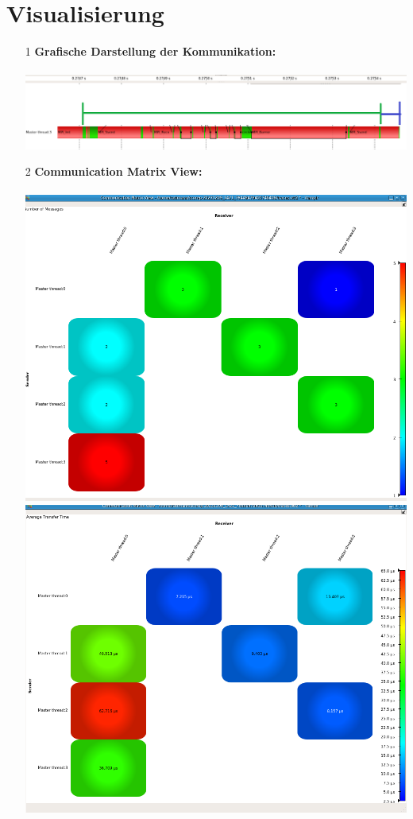 \documentclass[a4paper,10pt]{article}
\begin{document}
\section{Visualisierung}
\begin{itemize}
    \item[1] \textbf{Grafische Darstellung der Kommunikation:}\\\\
    \includegraphics[width=14cm]{GrafikKommunikation.png}
    \item[2] \textbf{Communication Matrix View:}\\\\
    \includegraphics[width=14cm]{CommunicationMatrixView1.png}\\
    \includegraphics[width=14cm]{CommunicationMatrixView2.png}\\

\end{itemize}
\end{document}
